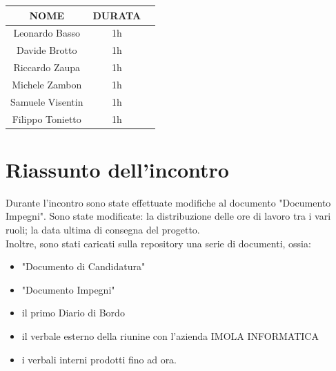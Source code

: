 \documentclass[12pt, oneside]{article}
\begin{document}
\begin{center}
	\begin{tabular}{ | c | c | c | }
		\hline
		NOME & DURATA \\ 
		\hline
		Leonardo Basso & 1h \\  
		\hline 
		Davide Brotto & 1h \\   
        \hline
        Riccardo Zaupa & 1h \\   
		\hline
        Michele Zambon & 1h \\   
        \hline
        Samuele Visentin & 1h \\
        \hline
        Filippo Tonietto & 1h \\
        \hline
	\end{tabular}
\end{center}

\section{Riassunto dell'incontro}
Durante l'incontro sono state effettuate modifiche al documento "Documento Impegni". Sono state modificate: la distribuzione delle ore di lavoro tra i vari ruoli; la data ultima di consegna del progetto. \\
Inoltre, sono stati caricati sulla repository una serie di documenti, ossia: 
\begin{itemize}
    \item "Documento di Candidatura"
    \item "Documento Impegni"
    \item il primo Diario di Bordo
    \item il verbale esterno della riunine con l'azienda IMOLA INFORMATICA
    \item i verbali interni prodotti fino ad ora.
\end{itemize}
\end{document}
